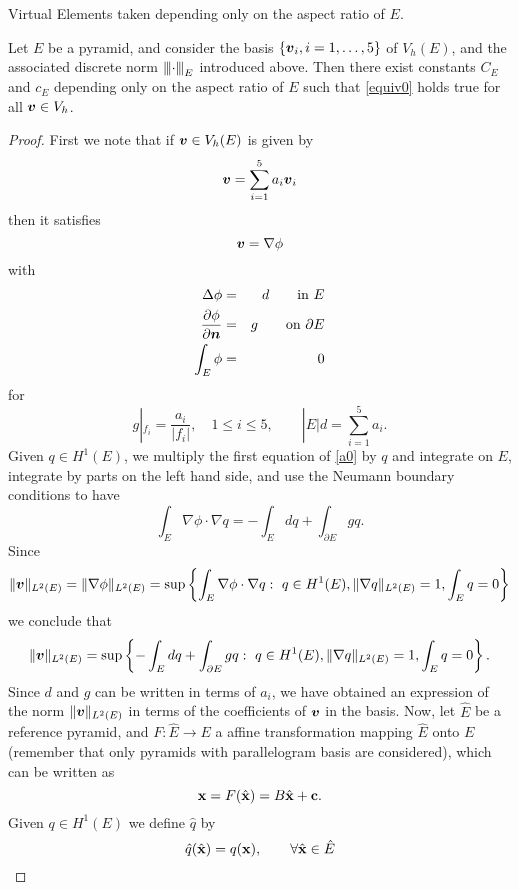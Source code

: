 \begin{chapter}{Virtual Elements}
taken depending only on the aspect ratio of $E$.%
\begin{proposition}
\label{stabilizing_term}
Let $E$ be a pyramid, and consider the basis $\{\boldsymbol{v}_i, i=1,\ldots,5\}$ of
$V_h(E)$, and the associated discrete norm ${\left\vert\kern-0.25ex\left\vert\kern-0.25ex\left\vert \cdot \right\vert\kern-0.25ex\right\vert\kern-0.25ex\right\vert}_E$ introduced
above. Then there exist constants $C_E$ and $c_E$ depending only on the aspect
ratio of $E$ such that \eqref{equiv0} holds true for all $\boldsymbol{v}\in V_h$.
\end{proposition}
\begin{proof} First we note that if $\boldsymbol{v}\in V_h(E)$ is given by
\[
\boldsymbol{v} = \sum_{i=1}^5a_i\boldsymbol{v}_i
\]
then it satisfies
\[
\boldsymbol{v} = \nabla\phi
\]
with 
\begin{eqnarray}\label{a0}
\Delta\phi &=& d\qquad \mbox{in }E\\ \frac{\partial\phi}{\partial\boldsymbol{n}}&=&
g\qquad\mbox{on }\partial E\nonumber\\ \int_E\phi&=&0\nonumber
\end{eqnarray}
for
\begin{equation}\label{ai}
g|_{f_i}=\frac{a_i}{|f_i|},\quad 1\leqslant i\le5, \qquad |E|d=\sum_{i=1}^5a_i.
\end{equation}
Given $q\in H^1(E)$, we multiply  the first equation of \eqref{a0} by $q$
and integrate on $E$, integrate by parts on the left hand side, and use the
Neumann boundary conditions to have
\[
\int_E\nabla\phi\cdot\nabla q = -\int_Edq + \int_{\partial E}gq.
\]
Since 
\[
\|\boldsymbol{v}\|_{L^2(E)}=\|\nabla\phi\|_{L^2(E)}=\sup\left\{\int_{E}\nabla\phi\cdot\nabla q:
\,\, q\in H^1(E),\|\nabla q\|_{L^2(E)}=1,\int_Eq=0\right\}
\]
we conclude that
\begin{equation}\label{equi0}
\|\boldsymbol{v}\|_{L^2(E)}=\sup\left\{-\int_Edq + \int_{\partial E}gq: \,\,
q\in H^1(E),\|\nabla q\|_{L^2(E)}=1,\int_Eq=0\right\}.
\end{equation}
Since $d$ and $g$ can be written in terms of $a_i$, we have obtained an
expression of the norm $\|\boldsymbol{v}\|_{L^2(E)}$ in terms of the coefficients of $\boldsymbol{v}$ in the basis.
Now, let $\hat E$ be a reference pyramid, and $F:\hat E\to E$ a affine
transformation mapping $\hat E$ onto $E$ (remember that only pyramids with
parallelogram basis are considered), which can be written as
\[
{\bf x}=F(\hat{\bf x})=B\hat{\bf x}+{\bf c}.
\] 
Given $q\in H^1(E)$ we define $\hat q$ by
\[
\hat q(\hat{\bf x}) = q({\bf x}),\qquad \forall \hat{\bf x}\in \hat E
\]
\end{proof}
\end{chapter}
